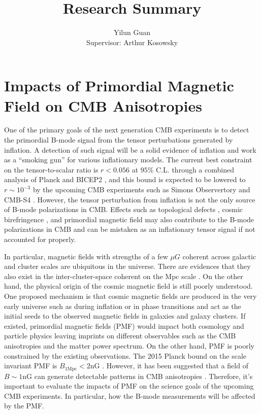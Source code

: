\documentclass[12pt, notitlepage, onecolumn, amsmath, amssymb, aps]{revtex4-1}
\title{}
\begin{document}
\title{Research Summary}
\author{Yilun Guan \\{\small Supervisor: Arthur Kosowsky}}
\maketitle
\newcommand{\edit}[1]{\textcolor{red}{(#1)}}
\vspace{-1.5cm}
\section{Impacts of Primordial Magnetic Field on CMB Anisotropies}
\label{sec:org8852578}
One of the primary goals of the next generation CMB experiments is to
detect the primordial B-mode signal from the tensor perturbations
generated by inflation. A detection of such signal will be a solid
evidence of inflation and work as a ``smoking gun'' for various
inflationary models. The current best constraint on the
tensor-to-scalar ratio is \(r<0.056\) at \(95\%\) C.L. through a
combined analysis of Planck and BICEP2 \cite{Akrami:2018odb}, and this
bound is expected to be lowered to \(r \sim 10^{-3}\) by the upcoming
CMB experiments such as Simons Observertory \cite{Ade:2018sbj} and
CMB-S4 \cite{abazajian16}. However, the tensor perturbation from
inflation is not the only source of B-mode polarizations in
CMB. Effects such as topological defects \cite{lizarraga14}, cosmic
birefringence \cite{lee15}, and primordial magnetic field
\cite{shaw10} may also contribute to the B-mode polarizations in CMB
and can be mistaken as an inflationary tensor signal if not accounted
for properly.

In particular, magnetic fields with strengths of a few $\mu G$
coherent across galactic and cluster scales are ubiquitous in the
universe. There are evidences that they also exist in the
inter-cluster-space coherent on the Mpc scale
\cite{2010Sci...328...73N}. On the other hand, the physical origin of
the cosmic magnetic field is still poorly understood. One proposed
mechanism is that cosmic magnetic fields are produced in the very
early universe such as during inflation \cite{PhysRevD.37.2743} or in
phase transitions \cite{Vachaspati:1991nm} and act as the initial
seeds to the observed magnetic fields in galaxies and galaxy
clusters. If existed, primordial magnetic fields (PMF) would impact
both cosmology and particle physics leaving imprints on different
observables such as the CMB anisotropies and the matter power
spectrum. On the other hand, PMF is poorly constrained by the existing
observations. The 2015 Planck bound on the scale invariant PMF is
\(B_{1 \mathrm{Mpc}} < 2 \mathrm{nG}\)
\cite{collaboration15}. However, it has been suggested that a field of
\(B \sim 1\mathrm{nG}\) can generate detectable patterns in CMB
anisotropies \cite{shaw10}. Therefore, it's important to evaluate the
impacts of PMF on the science goals of the upcoming CMB
experiments. In particular, how the B-mode measurements will be
affected by the PMF.
\end{document}

